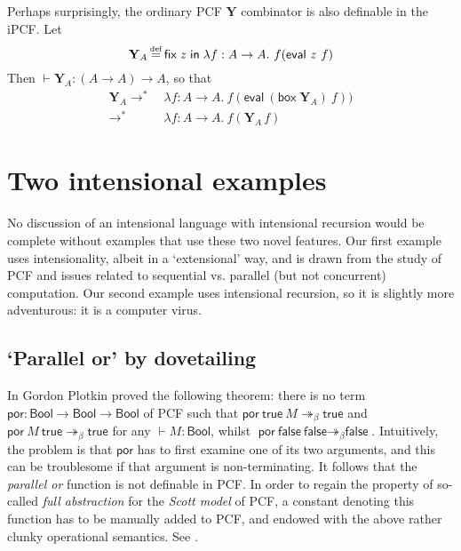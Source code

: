 \documentclass[11pt]{entcs}
\newcommand{\defeq}{\stackrel{\mathclap{\mbox{\tiny def}}}{=}}
\newcommand{\ibox}[1]{\mathsf{box\;}#1}
\newcommand{\fixlob}[2]{\mathsf{fix\;} #1 \mathsf{\;in\;} #2}
\newcommand{\redt}{\mathrel{\longrightarrow^\ast}}
\begin{document}
\begin{description}
Perhaps surprisingly, the ordinary PCF $\mathbf{Y}$ combinator is
also definable in the iPCF.  Let \[
  \mathbf{Y}_A \defeq
    \fixlob{z}{
      \lambda f : A \rightarrow A.\
        f (\textsf{eval}\ z\  f)
    }
\] Then $\vdash \mathbf{Y}_A : (A \rightarrow A) \rightarrow A$,
so that \begin{align*}
  \mathbf{Y}_A
    \redt{}\
  &\lambda f : A \rightarrow A.\ f (\textsf{eval}\ (\ibox{\mathbf{Y}_A})\ f)) \\
    \redt{}\
  &\lambda f : A \rightarrow A.\ f (\mathbf{Y}_A\, f)
\end{align*}


\end{description}


\section{Two intensional examples}
  \label{sec:ipcfexamples}

No discussion of an intensional language with intensional
recursion would be complete without examples that use these two
novel features. Our first example uses intensionality, albeit in a
`extensional' way, and is drawn from the study of PCF and issues
related to sequential vs. parallel (but not concurrent)
computation. Our second example uses intensional recursion, so it
is slightly more adventurous: it is a computer virus.

\subsection{`Parallel or' by dovetailing}

In \cite{Plotkin1977} Gordon Plotkin proved the following
theorem: there is no term $\textsf{por} : \textsf{Bool}
\rightarrow \textsf{Bool} \rightarrow \textsf{Bool}$ of PCF such
that $\textsf{por}\ \textsf{true}\ M \twoheadrightarrow_\beta
\textsf{true}$ and  $\textsf{por}\ M\ \textsf{true}
\twoheadrightarrow_\beta \textsf{true}$ for any $\vdash M :
\textsf{Bool}$, whilst $\textsf{por}\ \textsf{false}\
\textsf{false} \twoheadrightarrow_\beta \textsf{false}$.
Intuitively, the problem is that $\textsf{por}$ has to first
examine one of its two arguments, and this can be troublesome if
that argument is non-terminating. It follows that the
\emph{parallel or} function is not definable in PCF. In order to
regain the property of so-called \emph{full abstraction} for the
\emph{Scott model} of PCF, a constant denoting this function has
to be manually added to PCF, and endowed with the above rather
clunky operational semantics. See
\cite{Plotkin1977,Gunter1992,Mitchell1996,Streicher2006}.
\end{document}
